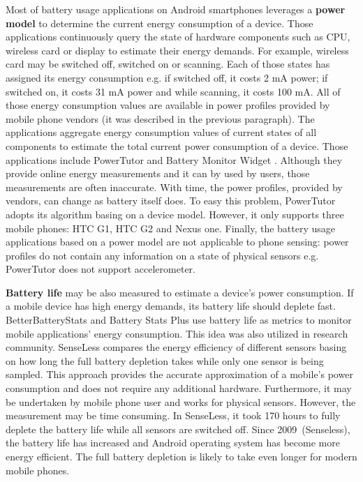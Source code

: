 Most of battery usage applications on Android smartphones leverages a \textbf{power model} to determine the current energy consumption of a device. Those applications continuously query the state of hardware components such as CPU, wireless card or display to estimate their energy demands. For example, wireless card may be switched off, switched on or scanning. Each of those states has assigned its energy consumption e.g. if switched off, it costs 2 mA power; if switched on, it costs 31 mA power and while scanning, it costs 100 mA. All of those energy consumption values are available in power profiles provided by mobile phone vendors (it was described in the previous paragraph). The applications aggregate energy consumption values of current states of all components to estimate the total current power consumption of a device. Those applications include PowerTutor \cite{zhang:powertutor} and Battery Monitor Widget \cite{googleplay:batterymonitorwidget}. Although they provide online energy measurements and it can by used by users, those measurements are often inaccurate. With time, the power profiles, provided by vendors, can change as battery itself does. To easy this problem, PowerTutor adopts its algorithm basing on a device model. However, it only supports three mobile phones: HTC G1, HTC G2 and Nexus one. Finally, the battery usage applications based on a power model are not applicable to phone sensing: power profiles do not contain any information on a state of physical sensors e.g. PowerTutor does not support accelerometer. 

\textbf{Battery life} may be also measured to estimate a device's power consumption. If a mobile device has high energy demands, its battery life should deplete fast. BetterBatteryStats \cite{googleplay:betterbatterystats} and Battery Stats Plus \cite{googleplay:batterystatsplus} use battery life as metrics to monitor mobile applications' energy consumption. This idea was also utilized in research community. SenseLess \cite{benabdesslem:senseless} compares the energy efficiency of different sensors basing on how long the full battery depletion takes while only one sensor is being sampled. This approach provides the accurate approximation of a mobile's power consumption and does not require any additional hardware. Furthermore, it may be undertaken by mobile phone user and works for physical sensors. However, the measurement may be time consuming. In SenseLess, it took 170 hours to fully deplete the battery life while all sensors are switched off. Since 2009\ (Senseless), the battery life has increased and Android operating system has become more energy efficient. The full battery depletion is likely to take even longer for modern mobile phones.


